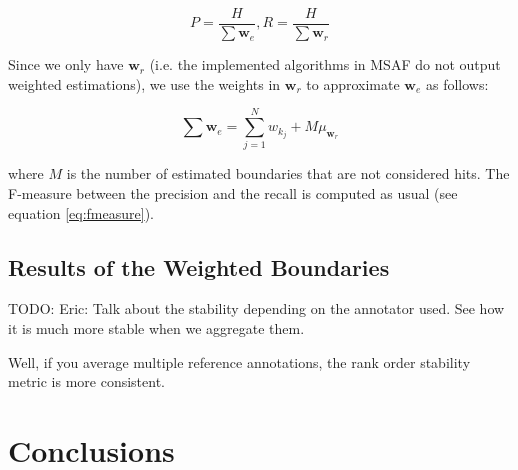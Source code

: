 \documentclass{article}
\begin{document}
\begin{equation}
  P = \frac{H}{\sum \textbf{w}_e} , R = \frac{H}{\sum \textbf{w}_r}
\end{equation}

Since we only have $\textbf{w}_r$ (i.e. the implemented algorithms in MSAF do not output weighted estimations), we use the weights in $\textbf{w}_r$ to approximate $\textbf{w}_e$ as follows:

\begin{equation}
  \sum \textbf{w}_e = \sum_{j = 1}^{N} w_{k_j} + M \mu_{\textbf{w}_r}
\end{equation}

where $M$ is the number of estimated boundaries that are not considered hits.
The F-measure between the precision and the recall is computed as usual (see equation \ref{eq:fmeasure}).







\subsection{Results of the Weighted Boundaries}

TODO: Eric: Talk about the stability depending on the annotator used. See how it is much more stable when we aggregate them.

Well, if you average multiple reference annotations, the rank order stability metric is more consistent.



\section{Conclusions}
\end{document}
